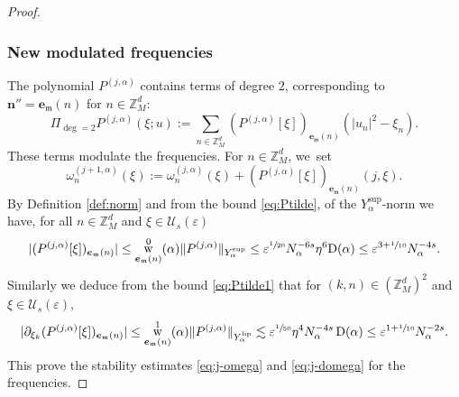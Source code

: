 \documentclass[JEP,XML,SOM,Unicode,published]{cedram}
\DeclareMathOperator{\rw}{w}
\theoremstyle{plain}
\theoremstyle{definition}
\newcommand{\nb}{{\boldsymbol n}}
\newcommand{\Z}{\mathbb{Z}}
\newcommand{\1}{\mathbf{1}}
\newcommand{\Ysup}[1]{Y_{#1}^{\mathrm{sup}}}
\newcommand{\Ylip}[1]{Y_{#1}^{\mathrm{lip}}}
\let\epsilon\varepsilon
\begin{document}
\begin{proof}
\subsubsection*{New modulated frequencies} The polynomial $P^{(j,\alpha)}$ contains terms of degree $2$, corresponding to $\nb''=\boldsymbol{e}_{\mathfrak{m}}(n)$ for $n\in\Z_{M}^{d}$:
\[
\Pi_{\deg=2}P^{(j,\alpha)}(\xi;u)
:= \sum_{n\in\Z_{M}^{d}}(P^{(j,\alpha)}[\xi])_{\boldsymbol{e}_{\mathfrak{m}}(n)}(|u_n|^{2}-\xi_{n}).
\]
These terms modulate the frequencies. For $n\in\Z_{M}^{d}$, we~set
\[
\omega_{n}^{(j+1,\alpha)}(\xi)
:= \omega_{n}^{(j,\alpha)}(\xi)
+ (P^{(j,\alpha)}[\xi])_{\boldsymbol{e}_{\mathfrak{m}}(n)}(j,\xi).
\]
By Definition \ref{def:norm} and from the bound \eqref{eq:Ptilde}, of the $\Ysup{\alpha}$-norm we have, for all $n\in\Z_{M}^{d}$ and $\xi\in\mathcal{U}_{s}(\epsilon)$
\[
|(P^{(j,\alpha)}[\xi])_{\boldsymbol{e}_{\mathfrak{m}}(n)}|
\leq \rw_{\boldsymbol{e}_{\mathfrak{m}}(n)}^{0}(\alpha)\|P^{(j,\alpha)}\|_{\Ysup{\alpha}}
\leq \epsilon^{\sfrac{1}{20}}
N_{\alpha}^{-6s}\eta^{6}\mathrm{D}(\alpha)
\leq \epsilon^{3+\sfrac{1}{10}}N_{\alpha}^{-4s}.
\]
Similarly we deduce from the bound \eqref{eq:Ptilde1} that for $(k,n)\in(\Z_{M}^{d})^{2}$ and $\xi\in\mathcal{U}_{s}(\epsilon)$,
\[
|\partial_{\xi_{k}} (P^{(j,\alpha)}[\xi])_{\boldsymbol{e}_{\mathfrak{m}}(n)}|
\leq
\rw_{\boldsymbol{e}_{\mathfrak{m}}(n)}^{1}(\alpha)
\|P^{(j,\alpha)}\|_{\Ylip{\alpha}}
\lesssim \epsilon^{\sfrac{1}{50}}\eta^{4}N_{\alpha}^{-4s}\operatorname{D}(\alpha)
\leq
\epsilon^{1+\sfrac{1}{10}}N_{\alpha}^{-2s}.
\]
This prove the stability estimates \eqref{eq:j-omega} and \eqref{eq:j-domega} for the frequencies.


\end{proof}
\end{document}
